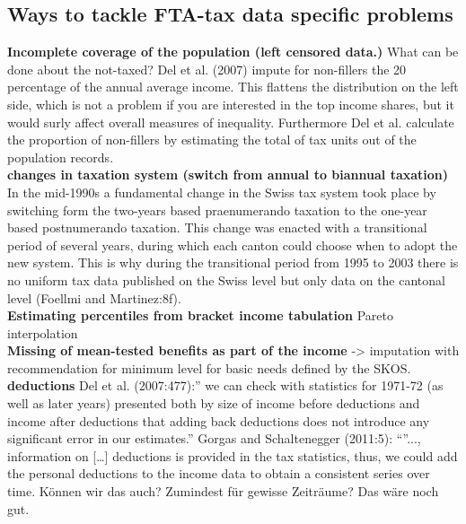 \documentclass[twoside]{article}\usepackage[]{graphicx}\usepackage[]{color}
\begin{document}
\begin{multicols}{2}
\subsection{Ways to tackle FTA-tax data specific problems}

\textbf{Incomplete coverage of the population (left censored data.)} What can be done about the not-taxed? Del et al. (2007) impute for non-fillers the 20 percentage of the annual average income. This flattens the distribution on the left side, which is not a problem if you are interested in the top income shares, but it would surly affect overall measures of inequality. Furthermore Del et al. calculate the proportion of non-fillers by estimating the total of tax units out of the population records. \\

\textbf{changes in taxation system  (switch from annual to biannual taxation)} In the mid-1990s a fundamental change in the Swiss tax system took place by switching form the two-years based praenumerando taxation to the one-year based postnumerando taxation. This change was enacted with a transitional period of several years, during which each canton could choose when to adopt the new system.  This is why during the transitional period from 1995 to 2003 there is no uniform tax data published on the Swiss level but only data on the cantonal level  (Foellmi and Martinez:8f). \\

\textbf{Estimating percentiles from bracket income tabulation} Pareto interpolation \\ 

\textbf{Missing of mean-tested benefits as part of the income} -> imputation with recommendation for minimum level for basic needs defined by the SKOS.\\

\textbf{deductions} Del et al. (2007:477):” we can check with statistics for 1971-72 (as well as later years) presented both by size of income before deductions and income after deductions that adding back deductions does not introduce any significant error in our estimates.”
Gorgas and Schaltenegger (2011:5): “”..., information on […] deductions is provided in the tax statistics, thus, we could add the personal deductions to the income data to obtain a consistent series over time. Können wir das auch? Zumindest für gewisse Zeiträume? Das wäre noch gut. \\


\end{multicols}
\end{document}
